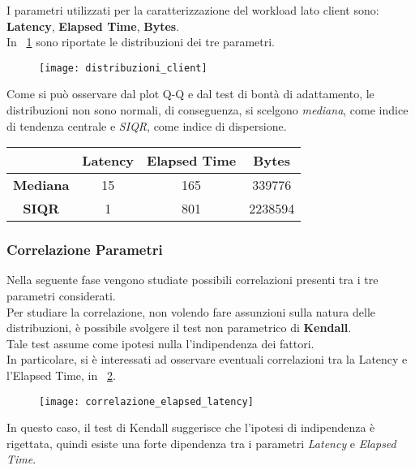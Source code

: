I parametri utilizzati per la caratterizzazione del workload lato client sono:
\textbf{Latency}, \textbf{Elapsed Time}, \textbf{Bytes}.\\

In \figurename~\ref{distribuzioni_parametri} sono riportate le distribuzioni dei
tre parametri.\\

\begin{figure}[!htbp]
  \centering
  \texttt{[image: distribuzioni\_client]}
  \caption{}
  \label{distribuzioni_parametri}
\end{figure}

Come si può osservare dal plot Q-Q e dal test di bontà di adattamento, le distribuzioni
non sono normali, di conseguenza, si scelgono \textit{mediana}, come indice di
tendenza centrale e \textit{SIQR}, come indice di dispersione.\\

\begin{center}
	\begin{tabular}{c|c|c|c|}
		& \textbf{Latency} & \textbf{Elapsed Time} & \textbf{Bytes} \\
		\hline
		\textbf{Mediana} & 15 & 165 & 339776 \\
		\hline
		\textbf{SIQR} & 1 & 801 & 2238594 \\
		\hline
	\end{tabular}
\end{center}

\subsubsection*{Correlazione Parametri}
Nella seguente fase vengono studiate possibili correlazioni presenti tra i tre
parametri considerati.\\
Per studiare la correlazione, non volendo fare assunzioni sulla natura delle
distribuzioni, è possibile svolgere il test non parametrico di \textbf{Kendall}.\\
Tale test assume come ipotesi nulla l'indipendenza dei fattori.\\
In particolare, si è interessati ad osservare eventuali correlazioni tra la Latency
e l'Elapsed Time, in \figurename~\ref{correlazione_elapsed_latency}.\\
\begin{figure}[!htbp]
  \centering
  \texttt{[image: correlazione\_elapsed\_latency]}
  \caption{}
  \label{correlazione_elapsed_latency}
\end{figure}

In questo caso, il test di Kendall suggerisce che l'ipotesi di indipendenza è
rigettata, quindi esiste una forte dipendenza tra i parametri \textit{Latency} e
\textit{Elapsed Time}.\\
